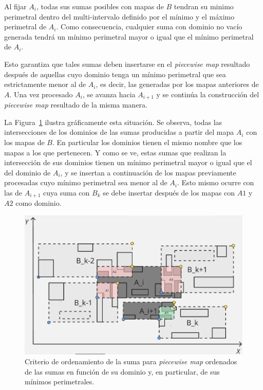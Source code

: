 Al fijar \(A_i\), todas sus sumas posibles con mapas de \(B\) tendran su minimo perimetral dentro del multi-intervalo definido por el mínimo y el máximo perimetral de \(A_i\). 
Como consecuencia, cualquier suma con dominio no vacío generada tendrá un mínimo perimetral mayor o igual 
que el mínimo perimetral de \(A_i\).


Esto garantiza que tales sumas deben insertarse en el \textit{piecewise map} resultado después de aquellas cuyo 
 dominio tenga un mínimo perimetral que sea estrictamente menor al de $A_i$, es decir, las generadas por los mapas anteriores de $A$. Una vez procesado $A_i$, se avanza hacia $A_{i+1}$ y se continúa la construcción del \textit{piecewise map} resultado de la misma manera.

La Figura~\ref{fig:crit-suma} ilustra gráficamente esta situación. Se observa, todas las intersecciones de los dominios de las sumas producidas a partir del mapa $A_i$ con los mapas de $B$. En particular los dominios tienen el mismo nombre que los mapas a los que pertenecen. Y como se ve, estas sumas que realizan la intersección de sus dominios tienen un mínimo perimetral mayor o igual que el del dominio de $A_i$, y se insertan a continuación de los mapas previamente procesadas cuyo mínimo perimetral sea menor al de $A_i$. Esto mismo ocurre con las de $A_{i+1}$ cuya suma con $B_k$ se debe insertar después de los mapas con $A1$ y  $A2$ como dominio.

\begin{figure}[h]
    \centering
    \includegraphics[width=0.8\linewidth]{figures/optimizaciones pwmap/op simils/crit suma.png}
    \caption{Criterio de ordenamiento de la suma para \textit{piecewise map} ordenados de las sumas en función de su dominio y, en particular, de sus mínimos perimetrales.}
    \label{fig:crit-suma}
\end{figure}

